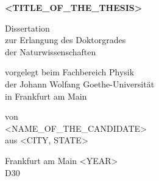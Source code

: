 \begin{titlepage}
  \vspace*{\fill}

  \begin{center} \sffamily\Huge\bfseries
    <TITLE_OF_THE_THESIS>
  \end{center}

  \vspace*{1cm}

  \begin{center} \sffamily\large
    Dissertation\\
    zur Erlangung des Doktorgrades\\
    der Naturwissenschaften
  \end{center}

  \vspace*{1cm}

  \begin{center} \sffamily\large
    vorgelegt beim Fachbereich Physik\\
    der Johann Wolfang Goethe-Universit\"at\\
    in Frankfurt am Main
  \end{center}

  \vspace*{1cm}

  \begin{center} \sffamily\large
    von\\
    <NAME_OF_THE_CANDIDATE>\\
    aus <CITY, STATE>
  \end{center}

  \vspace*{1cm}

  \begin{center} \sffamily\large
    Frankfurt am Main <YEAR>\\
    D30
  \end{center}

  \vspace*{\fill}
\end{titlepage}
